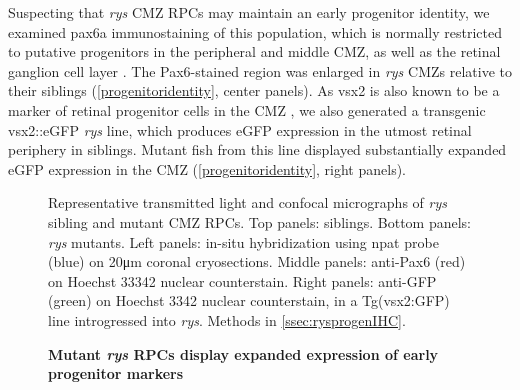 \documentclass{ut-thesis}
\begin{document}
\begin{NoHyper}
Suspecting that \textit{rys} CMZ RPCs may maintain an early progenitor identity, we examined pax6a immunostaining of this population, which is normally restricted to putative progenitors in the peripheral and middle CMZ, as well as the retinal ganglion cell layer \cite{Raymond2006}. The Pax6-stained region was enlarged in \textit{rys} CMZs relative to their siblings (\autoref{progenitoridentity}, center panels). As vsx2 is also known to be a marker of retinal progenitor cells in the CMZ \cite{Raymond2006}, we also generated a transgenic vsx2::eGFP \textit{rys} line, which produces eGFP expression in the utmost retinal periphery in siblings. Mutant fish from this line displayed substantially expanded eGFP expression in the CMZ (\autoref{progenitoridentity}, right panels).

\begin{figure}[!h]
    \caption{{\bf Mutant \textit{rys} RPCs display expanded expression of early progenitor markers}}
    Representative transmitted light and confocal micrographs of \textit{rys} sibling and mutant CMZ RPCs. Top panels: siblings. Bottom panels: \textit{rys} mutants. Left panels: in-situ hybridization using npat probe (blue) on 20\si{\micro\metre} coronal cryosections. Middle panels: anti-Pax6 (red) on Hoechst 33342 nuclear counterstain. Right panels: anti-GFP (green) on Hoechst 3342 nuclear counterstain, in a Tg(vsx2:GFP) line introgressed into \textit{rys}. 
    Methods in \autoref{ssec:rysprogenIHC}.
    \label{progenitoridentity}
\end{figure}


\end{NoHyper}
\end{document}
